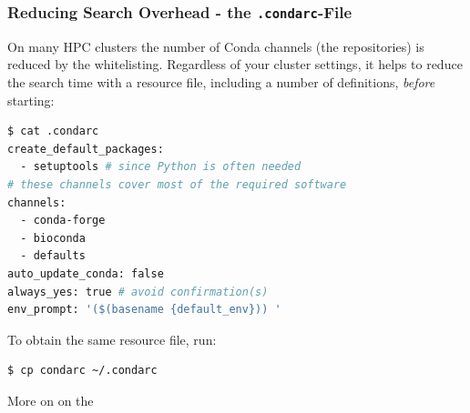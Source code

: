 \begin{frame}[fragile]
  \frametitle{Reducing Search Overhead - the \texttt{.condarc}-File}
  On many HPC clusters the number of Conda channels (the repositories) is reduced by the whitelisting. Regardless of your cluster settings, it helps to reduce the search time with a resource file, including  a number of definitions, \emph{before} starting:
  \begin{lstlisting}[language=Bash, style=Shell, basicstyle=\tiny]
$ cat .condarc
create_default_packages:
  - setuptools # since Python is often needed
# these channels cover most of the required software
channels:
  - conda-forge
  - bioconda
  - defaults
auto_update_conda: false
always_yes: true # avoid confirmation(s)
env_prompt: '($(basename {default_env})) '
  \end{lstlisting}
  To obtain the same resource file, run:
  \begin{lstlisting}[language=Bash, style=Shell, basicstyle=\footnotesize]
$ cp condarc ~/.condarc
  \end{lstlisting}
  More on  on the 
\end{frame}
